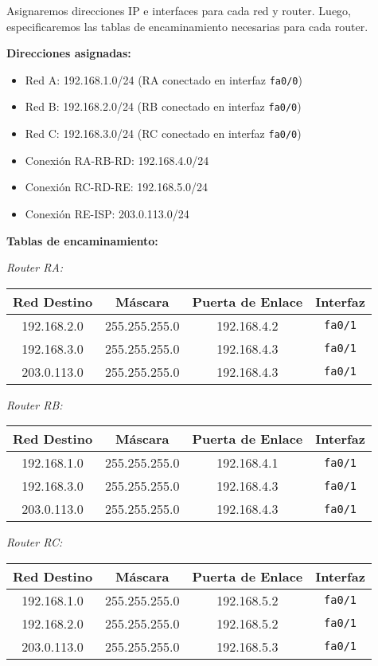 \documentclass[a4paper,12pt]{article}
\begin{document}
Asignaremos direcciones IP e interfaces para cada red y router. Luego, especificaremos las tablas de encaminamiento necesarias para cada router.

\textbf{Direcciones asignadas:}
\begin{itemize}
    \item Red A: 192.168.1.0/24 (RA conectado en interfaz \texttt{fa0/0})
    \item Red B: 192.168.2.0/24 (RB conectado en interfaz \texttt{fa0/0})
    \item Red C: 192.168.3.0/24 (RC conectado en interfaz \texttt{fa0/0})
    \item Conexión RA-RB-RD: 192.168.4.0/24
    \item Conexión RC-RD-RE: 192.168.5.0/24
    \item Conexión RE-ISP: 203.0.113.0/24
\end{itemize}

\textbf{Tablas de encaminamiento:}

\textit{Router RA:}
\begin{tabular}{|c|c|c|c|}
\hline
Red Destino & Máscara & Puerta de Enlace & Interfaz \\
\hline
192.168.2.0 & 255.255.255.0 & 192.168.4.2 & \texttt{fa0/1} \\
192.168.3.0 & 255.255.255.0 & 192.168.4.3 & \texttt{fa0/1} \\
203.0.113.0 & 255.255.255.0 & 192.168.4.3 & \texttt{fa0/1} \\
\hline
\end{tabular}

\textit{Router RB:}
\begin{tabular}{|c|c|c|c|}
\hline
Red Destino & Máscara & Puerta de Enlace & Interfaz \\
\hline
192.168.1.0 & 255.255.255.0 & 192.168.4.1 & \texttt{fa0/1} \\
192.168.3.0 & 255.255.255.0 & 192.168.4.3 & \texttt{fa0/1} \\
203.0.113.0 & 255.255.255.0 & 192.168.4.3 & \texttt{fa0/1} \\
\hline
\end{tabular}

\textit{Router RC:}
\begin{tabular}{|c|c|c|c|}
\hline
Red Destino & Máscara & Puerta de Enlace & Interfaz \\
\hline
192.168.1.0 & 255.255.255.0 & 192.168.5.2 & \texttt{fa0/1} \\
192.168.2.0 & 255.255.255.0 & 192.168.5.2 & \texttt{fa0/1} \\
203.0.113.0 & 255.255.255.0 & 192.168.5.3 & \texttt{fa0/1} \\
\hline
\end{tabular}
\end{document}

